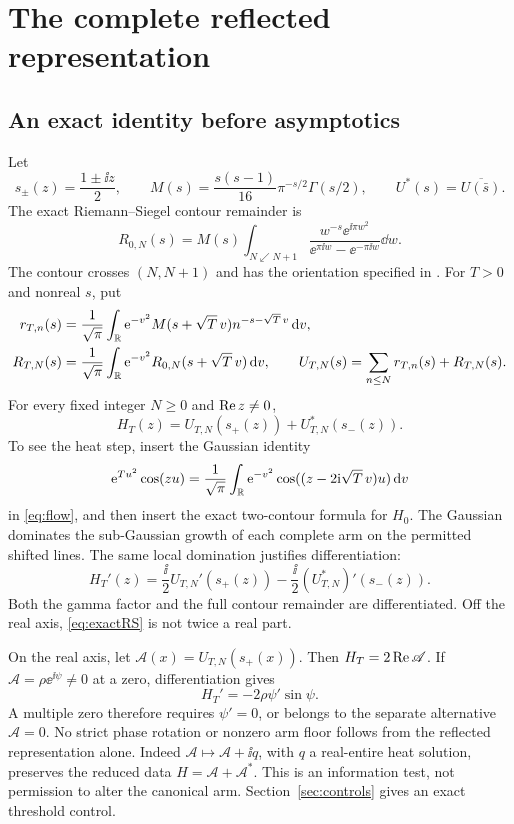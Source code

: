 \section{The complete reflected representation}\label{sec:representation}

\subsection{An exact identity before asymptotics}

Let
\[
 s_\pm(z)=\frac{1\pm\ii z}{2},\qquad
 M(s)=\frac{s(s-1)}{16}\pi^{-s/2}\Gamma(s/2),\qquad
 U^*(s)=\overline{U(\bar s)}.
\]
The exact Riemann--Siegel contour remainder is
\begin{equation}\label{eq:contour}
 R_{0,N}(s)=M(s)\int_{N\swarrow N+1}
       \frac{w^{-s}\ee^{\ii\pi w^2}}{\ee^{\pi\ii w}-\ee^{-\pi\ii w}}\dd w.
\end{equation}
The contour crosses \((N,N+1)\) and has the orientation specified in
\cite[Section 4, equations (36)--(38)]{polymath}. For \(T>0\) and
nonreal \(s\), put
\begin{align}
 r_{T,n}(s)&=\frac1{\sqrt\pi}\int_\mathbb R
  \mathrm e^{-v^2}M(s+\sqrt T\,v)n^{-s-\sqrt T\,v}\,\mathrm d v,\\
 R_{T,N}(s)&=\frac1{\sqrt\pi}\int_\mathbb R
  \mathrm e^{-v^2}R_{0,N}(s+\sqrt T\,v)\,\mathrm d v,\qquad
 U_{T,N}(s)=\sum_{n\le N}r_{T,n}(s)+R_{T,N}(s).
\end{align}
For every fixed integer \(N\ge0\) and \(\operatorname{Re} z\ne0\),
\begin{equation}\label{eq:exactRS}
 H_T(z)=U_{T,N}(s_+(z))+U_{T,N}^*(s_-(z)).
\end{equation}
To see the heat step, insert the Gaussian identity
\[
 \mathrm e^{Tu^2}\cos(zu)=\frac1{\sqrt\pi}\int_\mathbb R
       \mathrm e^{-v^2}\cos((z-2\mathrm i\sqrt T\,v)u)\,\mathrm d v
\]
in \eqref{eq:flow}, and then insert the exact two-contour formula for
\(H_0\). The Gaussian dominates the sub-Gaussian growth of each
complete arm on the permitted shifted lines. The same local domination
justifies differentiation:
\begin{equation}\label{eq:exactRSprime}
 H_T'(z)=\frac\ii2U_{T,N}'(s_+(z))
              -\frac\ii2(U_{T,N}^*)'(s_-(z)).
\end{equation}
Both the gamma factor and the full contour remainder are differentiated.
Off the real axis, \eqref{eq:exactRS} is not twice a real part.

On the real axis, let \(\mathscr A(x)=U_{T,N}(s_+(x))\).
Then \(H_T=2\operatorname{Re}\mathscr A\). If \(\mathscr A=\rho\ee^{\ii\psi}\ne0\)
at a zero, differentiation gives
\[
 H_T'=-2\rho\psi'\sin\psi.
\]
A multiple zero therefore requires \(\psi'=0\), or belongs to the
separate alternative \(\mathscr A=0\). No strict phase rotation or
nonzero arm floor follows from the reflected representation alone.
Indeed \(\mathscr A\mapsto\mathscr A+\ii q\), with \(q\) a real-entire
heat solution, preserves the reduced data \(H=\mathscr A+\mathscr A^*\).
This is an information test, not permission to alter the canonical arm.
Section~\ref{sec:controls} gives an exact threshold control.

